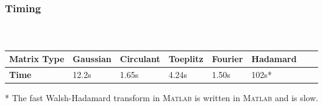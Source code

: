 \begin{frame}[t]
\frametitle{Timing}
\framesubtitle{~~}  %


\begin{table}[h]
\begin{tabular}{l|lllllll}
	\textbf{Matrix Type} & Gaussian & Circulant & Toeplitz & Fourier & Hadamard \\ \hline
	\textbf{Time}        & 12.2s    & 1.65s     & 4.24s    & 1.50s   & 102s*    \\
\end{tabular}
\end{table}
* The fast Walsh-Hadamard transform in \textsc{Matlab} is written in \textsc{Matlab} and is slow.


\end{frame}
